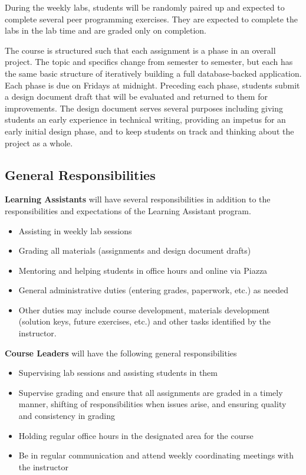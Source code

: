 \documentclass[12pt]{scrartcl}
\begin{document}
During the weekly labs, students will be randomly paired up and 
expected to complete several peer programming exercises.  They are 
expected to complete the labs in the lab time and are graded only on 
completion.

The course is structured such that each assignment is a phase in an
overall project.  The topic and specifics change from semester to 
semester, but each has the same basic structure of iteratively
building a full database-backed application.  Each phase is due on
Fridays at midnight.  Preceding each phase, students submit a
design document draft that will be evaluated and returned to them
for improvements.  The design document serves several purposes including
giving students an early experience in technical writing, providing
an impetus for an early initial design phase, and to keep students 
on track and thinking about the project as a whole.

\subsection*{General Responsibilities}

\textbf{Learning Assistants} will have several responsibilities in 
addition to the responsibilities and expectations of the Learning 
Assistant program.

\begin{itemize}
  \item Assisting in weekly lab sessions
  \item Grading all materials (assignments and design document drafts)
  \item Mentoring and helping students in office hours and online via Piazza
  \item General administrative duties (entering grades, paperwork, etc.) as needed
  \item Other duties may include course development, materials development 
  (solution keys, future exercises, etc.) and other tasks identified by the instructor.
\end{itemize}

\textbf{Course Leaders} will have the following general responsibilities
\begin{itemize}
  \item Supervising lab sessions and assisting students in them
  \item Supervise grading and ensure that all assignments are graded 
    in a timely manner, shifting of responsibilities when issues arise, 
    and ensuring quality and consistency in grading
  \item Holding regular office hours in the designated area for the course
  \item Be in regular communication and attend weekly coordinating meetings 
  with the instructor
\end{itemize}
\end{document}

